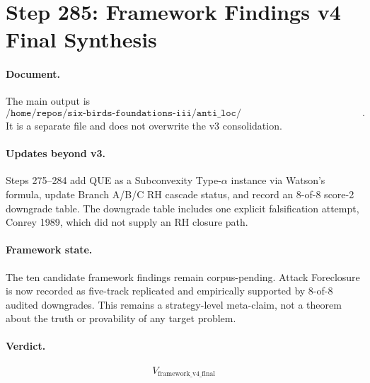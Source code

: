 \section*{Step 285: Framework Findings v4 Final Synthesis}

\paragraph{Document.}
The main output is
\[
\texttt{/home/repos/six-birds-foundations-iii/anti\_loc/findings\_framework\_v4\_final.md}.
\]
It is a separate file and does not overwrite the v3 consolidation.

\paragraph{Updates beyond v3.}
Steps 275--284 add QUE as a Subconvexity Type-\(\alpha\) instance via Watson's formula, update Branch A/B/C RH cascade status, and record an 8-of-8 score-2 downgrade table.  The downgrade table includes one explicit falsification attempt, Conrey 1989, which did not supply an RH closure path.

\paragraph{Framework state.}
The ten candidate framework findings remain corpus-pending.  Attack Foreclosure is now recorded as five-track replicated and empirically supported by 8-of-8 audited downgrades.  This remains a strategy-level meta-claim, not a theorem about the truth or provability of any target problem.

\paragraph{Verdict.}
\[
  \boxed{V_{\mathrm{framework\_v4\_final}}}
\]
